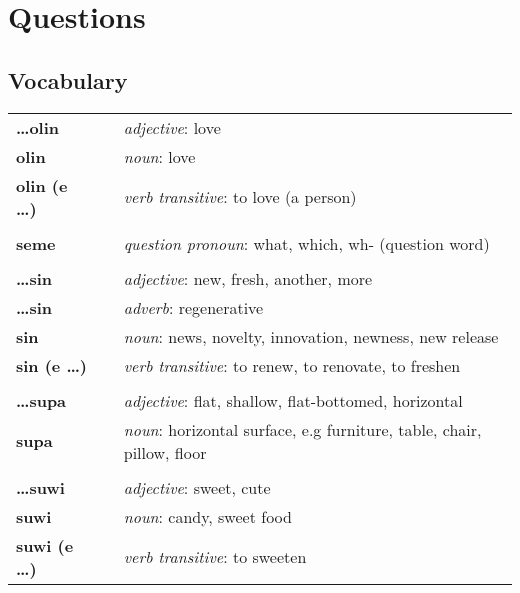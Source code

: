 
\section{Questions}
\subsection*{Vocabulary}

\begin{supertabular}{p{2,5cm}|ll}
    \textbf{\dots olin}     &  & \textit{adjective}: love                                                      \\
    \textbf{olin}           &  & \textit{noun}: love                                                           \\
    \textbf{olin (e \dots)} &  & \textit{verb transitive}: to love (a person)                                  \\
                            &  &                                                                               \\
    \textbf{seme}           &  & \textit{question pronoun}: what, which, wh- (question word)                   \\
                            &  &                                                                               \\
    \textbf{\dots sin}      &  & \textit{adjective}: new, fresh, another, more                                 \\
    \textbf{ \dots sin }    &  & \textit{adverb}: regenerative                                                 \\
    \textbf{sin}            &  & \textit{noun}: news, novelty, innovation, newness, new release                \\
    \textbf{sin (e \dots)}  &  & \textit{verb transitive}: to renew, to renovate, to freshen                   \\
                            &  &                                                                               \\
    \textbf{\dots supa}     &  & \textit{adjective}: flat, shallow, flat-bottomed, horizontal                  \\
    \textbf{supa}           &  & \textit{noun}: horizontal surface, e.g furniture, table, chair, pillow, floor \\
                            &  &                                                                               \\
    \textbf{\dots suwi}     &  & \textit{adjective}: sweet, cute                                               \\
    \textbf{suwi}           &  & \textit{noun}: candy, sweet food                                              \\
    \textbf{suwi (e \dots)} &  & \textit{verb transitive}: to sweeten                                          \\
\end{supertabular}

